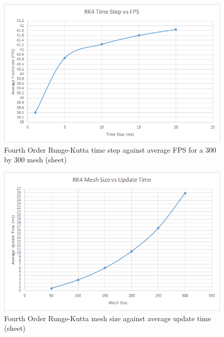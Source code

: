     \begin{figure}
    \begin{center}
      \includegraphics[scale=.9]{Figures/sheet_rk4_ts_fps}
    \end{center}
    \caption{Fourth Order Runge-Kutta time step against average FPS for a 300 by 300 mesh (sheet)}
    \label{fig:rk4 step fps sheet}
  \end{figure}
  
    \begin{figure}
    \begin{center}
      \includegraphics[scale=.9]{Figures/sheet_rk4_m_ut}
    \end{center}
    \caption{Fourth Order Runge-Kutta mesh size against average update time (sheet)}
    \label{fig:rk4 mesh update sheet}
  \end{figure}
  
